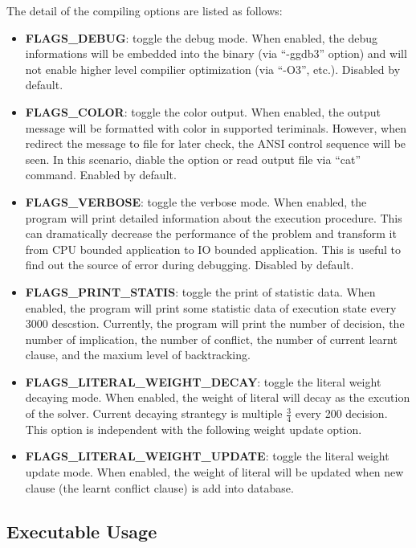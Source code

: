 \documentclass[a4paper, 11.5pt]{article}
\begin{document}
\begin{multicols}{2}
    The detail of the compiling options are listed as follows:
    \begin{itemize}
        \item {\bfseries FLAGS\_DEBUG}: toggle the debug mode. When enabled, the debug informations 
        will be embedded into the binary (via ``-ggdb3'' option) and will not enable higher level compilier optimization (via ``-O3'', etc.). Disabled by default.
        \item {\bfseries FLAGS\_COLOR}: toggle the color output. When enabled, the output message will be formatted with color in supported teriminals. However, when redirect the message to file for later check, the ANSI control sequence will be seen. In this scenario, diable the option or read output file via ``cat'' command. Enabled by default.
        \item {\bfseries FLAGS\_VERBOSE}: toggle the verbose mode. When enabled, the program will
        print detailed information about the execution procedure. This can dramatically decrease the performance of the problem and transform it from CPU bounded application to IO bounded application. This is useful to find out the source of error during debugging. Disabled by default.
        \item {\bfseries FLAGS\_PRINT\_STATIS}: toggle the print of statistic data. When enabled, 
        the program will print some statistic data of execution state every 3000 descstion. 
        Currently, the program will print the number of decision, the number of implication, 
        the number of conflict, the number of current learnt clause, and the maxium level of backtracking.
        \item {\bfseries FLAGS\_LITERAL\_WEIGHT\_DECAY}: toggle the literal weight decaying mode. When enabled,
        the weight of literal will decay as the excution of the solver. Current decaying strantegy is multiple $\frac{3}{4}$ every 200 decision.
        This option is independent with the following weight update option.
        \item {\bfseries FLAGS\_LITERAL\_WEIGHT\_UPDATE}: toggle the literal weight update mode. When enabled, 
        the weight of literal will be updated when new clause (the learnt conflict clause) is add into database.        
    \end{itemize}

    \subsection{Executable Usage}


\end{multicols}
\end{document}
